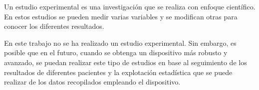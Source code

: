 Un estudio experimental es una investigación que se realiza con enfoque científico. En estos estudios se pueden medir varias variables y se modifican otras para conocer los diferentes resultados.

En este trabajo no se ha realizado un estudio experimental. Sin embargo, es posible que en el futuro, cuando se obtenga un dispositivo más robusto y avanzado, se puedan realizar este tipo de estudios en base al seguimiento de los resultados de diferentes pacientes y la explotación estadística que se puede realizar de los datos recopilados empleando el dispositivo.



